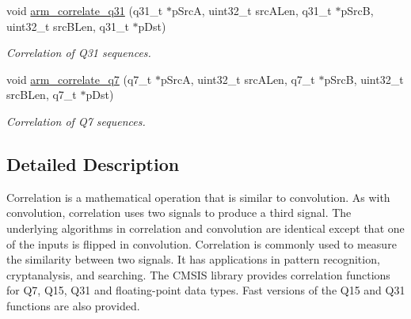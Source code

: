 \begin{DoxyCompactItemize}
void \hyperlink{group___corr_ga1367dc6c80476406c951e68d7fac4e8c}{arm\-\_\-correlate\-\_\-q31} (q31\-\_\-t $\ast$p\-Src\-A, uint32\-\_\-t src\-A\-Len, q31\-\_\-t $\ast$p\-Src\-B, uint32\-\_\-t src\-B\-Len, q31\-\_\-t $\ast$p\-Dst)
\begin{DoxyCompactList}\small\item\em Correlation of Q31 sequences. \end{DoxyCompactList}\item 
void \hyperlink{group___corr_ga284ddcc49e4ac532d52a70d0383c5992}{arm\-\_\-correlate\-\_\-q7} (q7\-\_\-t $\ast$p\-Src\-A, uint32\-\_\-t src\-A\-Len, q7\-\_\-t $\ast$p\-Src\-B, uint32\-\_\-t src\-B\-Len, q7\-\_\-t $\ast$p\-Dst)
\begin{DoxyCompactList}\small\item\em Correlation of Q7 sequences. \end{DoxyCompactList}\end{DoxyCompactItemize}


\subsection{Detailed Description}
Correlation is a mathematical operation that is similar to convolution. As with convolution, correlation uses two signals to produce a third signal. The underlying algorithms in correlation and convolution are identical except that one of the inputs is flipped in convolution. Correlation is commonly used to measure the similarity between two signals. It has applications in pattern recognition, cryptanalysis, and searching. The C\-M\-S\-I\-S library provides correlation functions for Q7, Q15, Q31 and floating-\/point data types. Fast versions of the Q15 and Q31 functions are also provided.

